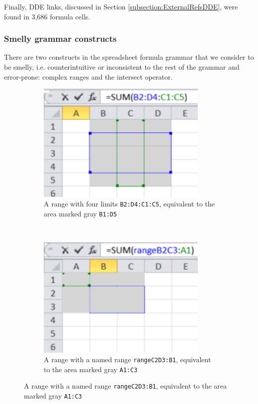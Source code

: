 \documentclass[conference]{IEEEtran}
\begin{document}
Finally, DDE links, discussed in Section \ref{subsection:ExternalRefsDDE}, were found in 3,686 formula cells.

\subsubsection{Smelly grammar constructs}
There are two constructs in the spreadsheet formula grammar that we consider to be smelly, i.e. counterintuitive or inconsistent to the rest of the grammar and error-prone: complex ranges and the intersect operator.
\begin{figure}
	\centering
	\caption{Examples of references to complex ranges}\label{Figure:ComplexRanges}
	\begin{subfigure}[b]{0.4\textwidth}
		\centering
		\includegraphics[width=0.9\textwidth]{complexRanges}
		\vspace{0.0001mm}
		\caption{A range with four limits \texttt{B2:D4:C1:C5}, equivalent to the area marked gray \texttt{B1:D5}}
		\label{fig:complexA}
	\end{subfigure}
	~ %
	\begin{subfigure}[b]{0.4\textwidth}
		\centering
		\includegraphics[width=0.9\textwidth]{complexNamedRanges}
		\vspace{0.1mm}
		\caption{A range with a named range \texttt{rangeC2D3:B1}, equivalent to the area marked gray \texttt{A1:C3}}
		\label{fig:complexB}
	\end{subfigure}
\end{figure}
\end{document}
